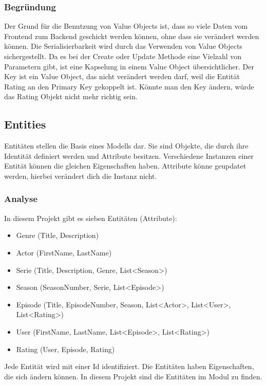         \subsubsection{Begründung}
        Der Grund für die Benutzung von Value Objects ist, dass so viele Daten vom Frontend zum Backend geschickt werden können, ohne dass sie verändert werden können. Die Serialisierbarkeit wird durch das Verwenden von Value Objects sichergestellt. Da es bei der Create oder Update Methode eine Vielzahl von Parametern gibt, ist eine Kapselung in einem Value Object übersichtlicher.
        Der Key ist ein Value Object, das nicht verändert werden darf, weil die Entität Rating an den Primary Key gekoppelt ist. Könnte man den Key ändern, würde das Rating Objekt nicht mehr richtig sein.

    \subsection{Entities} \label{1.entities}
    Entitäten stellen die Basis eines Modells dar. Sie sind Objekte, die durch ihre Identität definiert werden und Attribute besitzen. Verschiedene Instanzen einer Entität können die gleichen Eigenschaften haben. Attribute könne geupdatet werden, hierbei verändert dich die Instanz nicht. 

        \subsubsection{Analyse}
        In diesem Projekt gibt es sieben Entitäten (Attribute):
        \begin{itemize}
            \item Genre (Title, Description)
            \item Actor (FirstName, LastName)
            \item Serie (Title, Description, Genre, List<Season>)
            \item Season (SeasonNumber, Serie, List<Episode>)
            \item Episode (Title, EpisodeNumber, Season, List<Actor>, List<User>, List<Rating>)
            \item User (FirstName, LastName, List<Episode>, List<Rating>)
            \item Rating (User, Episode, Rating)
        \end{itemize}
        Jede Entität wird mit einer Id identifiziert. Die Entitäten haben Eigenschaften, die sich ändern können. In diesem Projekt sind die Entitäten im Modul  zu finden.

